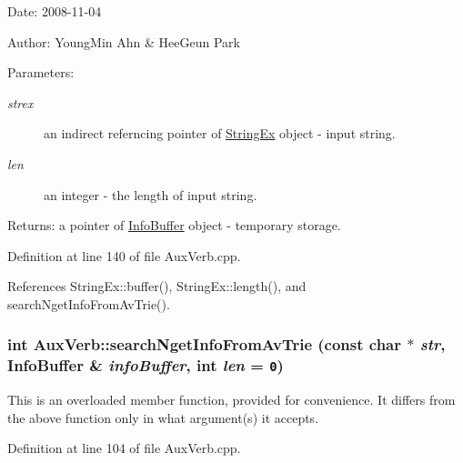 \begin{Desc}
\item[Date:]2008-11-04 \end{Desc}
\begin{Desc}
\item[Author:]YoungMin Ahn \& HeeGeun Park \end{Desc}
\begin{Desc}
\item[Parameters:]
\begin{description}
\item[{\em strex}]an indirect referncing pointer of \hyperlink{classStringEx}{StringEx} object - input string. \item[{\em len}]an integer - the length of input string. \end{description}
\end{Desc}
\begin{Desc}
\item[Returns:]a pointer of \hyperlink{classkmaOrange_1_1InfoBuffer}{InfoBuffer} object - temporary storage. \end{Desc}


Definition at line 140 of file AuxVerb.cpp.

References StringEx::buffer(), StringEx::length(), and searchNgetInfoFromAvTrie().\hypertarget{classkmaOrange_1_1AuxVerb_23873257b24cdd49b86a54b9dee21c6c}{
\subsubsection[{searchNgetInfoFromAvTrie}]{\setlength{\rightskip}{0pt plus 5cm}int AuxVerb::searchNgetInfoFromAvTrie (const char $\ast$ {\em str}, \/  {\bf InfoBuffer} \& {\em infoBuffer}, \/  int {\em len} = {\tt 0})}}
\label{classkmaOrange_1_1AuxVerb_23873257b24cdd49b86a54b9dee21c6c}


This is an overloaded member function, provided for convenience. It differs from the above function only in what argument(s) it accepts. 

Definition at line 104 of file AuxVerb.cpp.

